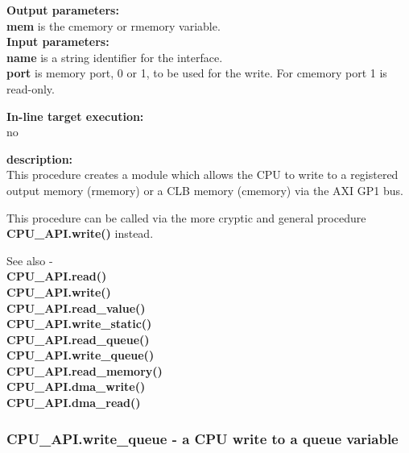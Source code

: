             {\bf Output parameters:} \\
            {\bf mem} is the cmemory or rmemory variable.\\

            {\bf Input parameters:} \\
            {\bf name} is a string identifier for the interface.\\
            {\bf port} is memory port, 0 or 1, to be used for the write. For
            cmemory port 1 is read-only.
        
            {\bf In-line target execution:} \\
            no

            {\bf description:} \\
            This procedure creates a module which allows the CPU to write
            to a registered output memory (rmemory) or a CLB memory (cmemory)
            via the AXI GP1 bus.
            
            This procedure can be called via the more cryptic and general
            procedure {\bf CPU\_API.write()}  instead.
            
            

            See also - \\
            {\bf CPU\_API.read()}  \\
            {\bf CPU\_API.write()}  \\
            {\bf CPU\_API.read\_value()}  \\
            {\bf CPU\_API.write\_static()}  \\
            {\bf CPU\_API.read\_queue()}  \\
            {\bf CPU\_API.write\_queue()}  \\
            {\bf CPU\_API.read\_memory()}  \\
            {\bf CPU\_API.dma\_write()}  \\
            {\bf CPU\_API.dma\_read()}  \\


           



        \subsubsection{CPU\_API.write\_queue - a CPU write to a queue
                                            variable}\label{sec:lpcpuwrqueue}

